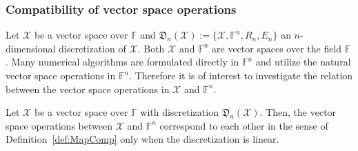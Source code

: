 \documentclass[a4paper]{paper}
\newcommand{\discr}{\mathfrak{D}}
\newcommand{\VecSpace}[1]{\mathscr{#1}}
\newcommand{\Field}{\mathbb{F}}
\begin{document}
\subsubsection{Compatibility of vector space operations}
Let $\VecSpace{X}$ be a vector space over $\Field$ and 
$\discr_{n}(\VecSpace{X}):=\{\VecSpace{X},\Field^{n},R_{n},E_{n}\}$ an $n$-dimensional discretization of 
$\VecSpace{X}$.  Both $\VecSpace{X}$ and $\Field^{n}$ are vector spaces over the field $\Field$. 
Many numerical algorithms are 
formulated directly in $\Field^{n}$ and utilize the natural vector space operations in $\Field^{n}$. Therefore it is of
interest to investigate the relation between the vector space operations in $\VecSpace{X}$ and $\Field^{n}$.

\begin{theorem}\label{ThmVecSpaceCorr}
  Let $\VecSpace{X}$ be a vector space over $\Field$ with discretization $\discr_{n}(\VecSpace{X})$. Then,
  the vector space operations between $\VecSpace{X}$ and $\Field^{n}$ correspond
  to each other in the sense of Definition~\ref{def:MapComp} only when the discretization is linear.
\end{theorem}
\end{document}
